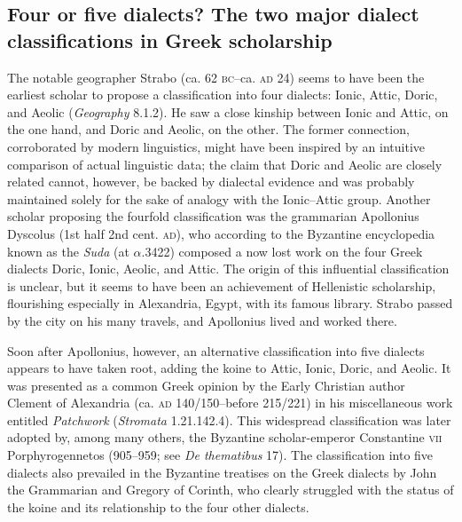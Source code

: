 \subsection{Four or five dialects? The two major dialect classifications in Greek scholarship}
\hypertarget{Toc19704808}{}\begin{styleStandard}
The notable geographer Strabo (ca. 62 \textsc{bc–}ca. \textsc{ad} 24) seems to have been the earliest scholar to propose a classification into four dialects: Ionic, Attic, Doric, and Aeolic (\textit{Geography} 8.1.2). He saw a close kinship between Ionic and Attic, on the one hand, and Doric and Aeolic, on the other. The former connection, corroborated by modern linguistics, might have been inspired by an intuitive comparison of actual linguistic data; the claim that Doric and Aeolic are closely related cannot, however, be backed by dialectal evidence and was probably maintained solely for the sake of analogy with the Ionic–Attic group. Another scholar proposing the fourfold classification was the grammarian Apollonius Dyscolus (1st half 2nd cent. \textsc{ad}), who according to the Byzantine encyclopedia known as the \textit{Suda} (at $\alpha $.3422) composed a now lost work on the four Greek dialects Doric, Ionic, Aeolic, and Attic. The origin of this influential classification is unclear, but it seems to have been an achievement of Hellenistic scholarship, flourishing especially in Alexandria, Egypt, with its famous library. Strabo passed by the city on his many travels, and Apollonius lived and worked there.
\end{styleStandard}

\begin{styleStandard}
Soon after Apollonius, however, an alternative classification into five dialects appears to have taken root, adding the koine to Attic, Ionic, Doric, and Aeolic. It was presented as a common Greek opinion by the Early Christian author Clement of Alexandria (ca. \textsc{ad} 140/150–before 215/221) in his miscellaneous work entitled \textit{Patchwork} (\textit{Stromata} 1.21.142.4). This widespread classification was later adopted by, among many others, the Byzantine scholar-emperor Constantine \textsc{vii} Porphyrogennetos (905–959; see \textit{De thematibus} 17). The classification into five dialects also prevailed in the Byzantine treatises on the Greek dialects by John the Grammarian and Gregory of Corinth, who clearly struggled with the status of the koine and its relationship to the four other dialects.
\end{styleStandard}

